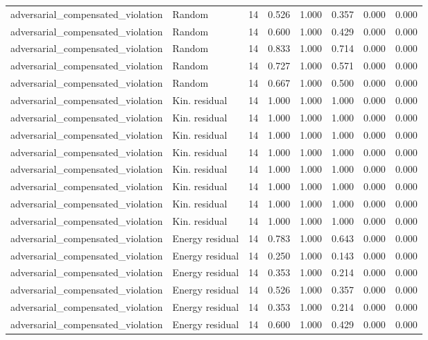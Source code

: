 {\begin{longtable}{llrrrrrr}
adversarial\_compensated\_violation & Random & 14 & 0.526 & 1.000 & 0.357 & 0.000 & 0.000 \\
adversarial\_compensated\_violation & Random & 14 & 0.600 & 1.000 & 0.429 & 0.000 & 0.000 \\
adversarial\_compensated\_violation & Random & 14 & 0.833 & 1.000 & 0.714 & 0.000 & 0.000 \\
adversarial\_compensated\_violation & Random & 14 & 0.727 & 1.000 & 0.571 & 0.000 & 0.000 \\
adversarial\_compensated\_violation & Random & 14 & 0.667 & 1.000 & 0.500 & 0.000 & 0.000 \\
adversarial\_compensated\_violation & Kin. residual & 14 & 1.000 & 1.000 & 1.000 & 0.000 & 0.000 \\
adversarial\_compensated\_violation & Kin. residual & 14 & 1.000 & 1.000 & 1.000 & 0.000 & 0.000 \\
adversarial\_compensated\_violation & Kin. residual & 14 & 1.000 & 1.000 & 1.000 & 0.000 & 0.000 \\
adversarial\_compensated\_violation & Kin. residual & 14 & 1.000 & 1.000 & 1.000 & 0.000 & 0.000 \\
adversarial\_compensated\_violation & Kin. residual & 14 & 1.000 & 1.000 & 1.000 & 0.000 & 0.000 \\
adversarial\_compensated\_violation & Kin. residual & 14 & 1.000 & 1.000 & 1.000 & 0.000 & 0.000 \\
adversarial\_compensated\_violation & Kin. residual & 14 & 1.000 & 1.000 & 1.000 & 0.000 & 0.000 \\
adversarial\_compensated\_violation & Kin. residual & 14 & 1.000 & 1.000 & 1.000 & 0.000 & 0.000 \\
adversarial\_compensated\_violation & Energy residual & 14 & 0.783 & 1.000 & 0.643 & 0.000 & 0.000 \\
adversarial\_compensated\_violation & Energy residual & 14 & 0.250 & 1.000 & 0.143 & 0.000 & 0.000 \\
adversarial\_compensated\_violation & Energy residual & 14 & 0.353 & 1.000 & 0.214 & 0.000 & 0.000 \\
adversarial\_compensated\_violation & Energy residual & 14 & 0.526 & 1.000 & 0.357 & 0.000 & 0.000 \\
adversarial\_compensated\_violation & Energy residual & 14 & 0.353 & 1.000 & 0.214 & 0.000 & 0.000 \\
adversarial\_compensated\_violation & Energy residual & 14 & 0.600 & 1.000 & 0.429 & 0.000 & 0.000 \\

\end{longtable}}

